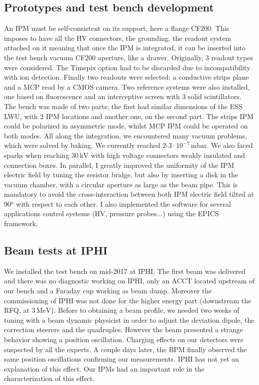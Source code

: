 \subsection*{Prototypes and test bench development}

An IPM must be self-consistent on its support, here a flange CF200. This imposes to have all the HV connectors, the grounding, the readout system attached on it meaning that once the IPM is integrated, it can be inserted into the test bench vacuum CF200 aperture, like a drawer. Originally, 3 readout types were considered. The Timepix option had to be discarded due to incompatibility with ion detection. Finally two readouts were selected: a conductive strips plane and a MCP read by a CMOS camera. Two reference systems were also installed, one based on fluorescence and an interceptive screen with 3 solid scintillators. The bench was made of two parts; the first had similar dimensions of the ESS LWU, with 2 IPM locations and another one, on the second part.
The strips IPM could be polarized in asymmetric mode, whilst MCP IPM could be operated on both modes. All along the integration, we encountered many vacuum problems, which were solved by baking. We currently reached $2$-$3 \cdot 10^{-7}\,\mathrm{mbar}$.
We also faced sparks when reaching $30\,\mathrm{kV}$ with high voltage connectors weakly insulated and connection boxes. In parallel, I greatly improved the uniformity of the IPM electric field by tuning the resistor bridge, but also by inserting a disk in the vacuum chamber, with a circular aperture as large as the beam pipe. This is mandatory to avoid the cross-interaction between both IPM electric field tilted at $90\mathrm{^{o}}$ with respect to each other.
I also implemented the software for several applications control systems (HV, pressure probes...) using the EPICS framework.

\subsection*{Beam tests at IPHI}

We installed the test bench on mid-2017 at IPHI. The first beam was delivered and there was no diagnostic working on IPHI, only an ACCT located upstream of our bench and a Faraday cup working as beam dump. Moreover the commissioning of IPHI was not done for the higher energy part (downstream the RFQ, at $3\,\mathrm{MeV}$). Before to obtaining a beam profile, we needed two weeks of tuning with a beam dynamic physicist in order to adjust the deviation dipole, the correction steerers and the quadruples. However the beam presented a strange behavior showing a position oscillation. Charging effects on our detectors were suspected by all the experts. A couple days later, the BPM finally observed the same position oscillations confirming our measurements. IPHI has not yet an explanation of this effect. Our IPMs had an important role in the characterization of this effect.

